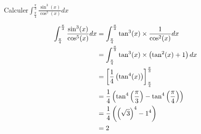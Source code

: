 \begin{exoex}
    ~\\
	Calculer\(\int_{\frac{\pi}{4}}^{\frac{\pi}{3}} \frac{\sin^3(x)}{\cos^5(x)} dx\)
\end{exoex}

\begin{corr}
	\begin{align*}
		\int_{\frac{\pi}{4}}^{\frac{\pi}{3}} \frac{\sin^3(x)}{\cos^5(x)} dx & = \int_{\frac{\pi}{4}}^{\frac{\pi}{3}} \tan^3(x) \times \frac{1}{\cos^2(x)} dx \\
		                                                                    & = \int_{\frac{\pi}{4}}^{\frac{\pi}{3}} \tan^3(x) \times \left(\tan^2(x)+1\right) dx \\
		                                                                    & = \left[\frac{1}{4}\left(\tan^4(x) \right)\right]_{\frac{\pi}{4}}^{\frac{\pi}{3}}        \\
		                                                                    & = \frac{1}{4}\left(\tan^4\left(\frac{\pi}{3}\right) - \tan^4\left(\frac{\pi}{4}\right)\right) \\
		                                                                    & = \frac{1}{4}\left(\left(\sqrt{3}\right)^4 - 1^4\right)                                  \\
		                                                                    & = 2                                                                            \\
	\end{align*}
\end{corr}

